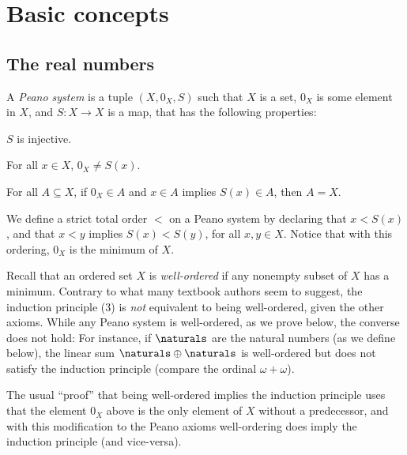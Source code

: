 \documentclass[article, a4paper, 11pt, oneside]{memoir}
\title{\doctitle}
\author{\docauthor}
\numberwithin{equation}{chapter}
\begin{document}
\maketitle


\chapter{Basic concepts}

\section{The real numbers}

\begin{definition}
    A \emph{Peano system} is a tuple $(X,0_X,S)$ such that $X$ is a set, $0_X$ is some element in $X$, and $S \colon X \to X$ is a map, that has the following properties:
    \begin{enumdef}
        \item $S$ is injective.
        \item For all $x \in X$, $0_X \neq S(x)$.
        \item For all $A \subseteq X$, if $0_X \in A$ and $x \in A$ implies $S(x) \in A$, then $A = X$.
    \end{enumdef}
\end{definition}
%
We define a strict total order $<$ on a Peano system by declaring that $x < S(x)$, and that $x < y$ implies $S(x) < S(y)$, for all $x,y \in X$. Notice that with this ordering, $0_X$ is the minimum of $X$.

\begin{remark}
    Recall that an ordered set $X$ is \emph{well-ordered} if any nonempty subset of $X$ has a minimum. Contrary to what many textbook authors seem to suggest, the induction principle (3) is \emph{not} equivalent to being well-ordered, given the other axioms. While any Peano system is well-ordered, as we prove below, the converse does not hold: For instance, if $\naturals$ are the natural numbers (as we define below), the linear sum $\naturals \oplus \naturals$ is well-ordered but does not satisfy the induction principle (compare the ordinal $\omega + \omega$).

    The usual \enquote{proof} that being well-ordered implies the induction principle uses that the element $0_X$ above is the only element of $X$ without a predecessor, and with this modification to the Peano axioms well-ordering does imply the induction principle (and vice-versa).
\end{remark}
\end{document}
